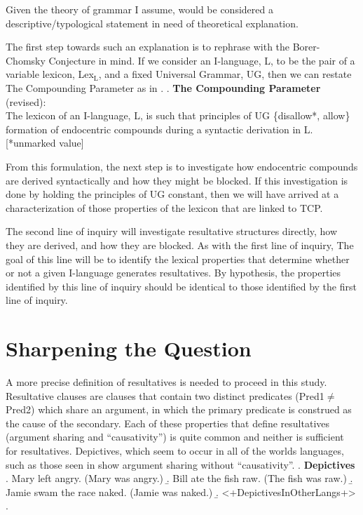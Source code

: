 \documentclass[letterpaper,12pt]{article}
\newcommand{\figex}{\refstepcounter{ExNo}\theExNo\hspace{\Exlabelsep}}
\begin{document}
Given the theory of grammar I assume, \Last would be considered a descriptive/typological statement in need of theoretical explanation.

The first step towards such an explanation is to rephrase \Last with the Borer-Chomsky Conjecture in mind.
If we consider an I-language, L, to be the pair of a variable lexicon, Lex$_\text{L}$, and a fixed Universal Grammar, UG, then we can restate The Compounding Parameter as in \Next.
\ex. \textbf{The Compounding Parameter} (revised):\\
The lexicon of an I-language, L, is such that principles of UG \{disallow*, allow\} formation of endocentric compounds during a syntactic derivation in L. [*unmarked value]

From this formulation, the next step is to investigate how endocentric compounds are derived syntactically and how they might be blocked.
If this investigation is done by holding the principles of UG constant, then we will have arrived at a characterization of those properties of the lexicon that are linked to TCP.

The second line of inquiry will investigate resultative structures directly, how they are derived, and how they are blocked.
As with the first line of inquiry, The goal of this line will be to identify the lexical properties that determine whether or not a given I-language generates resultatives.
By hypothesis, the properties identified by this line of inquiry should be identical to those identified by the first line of inquiry.


\begin{figure}[h]
  \figex
  \label{fig:ParameterModel}
\end{figure}

\section{Sharpening the Question}\label{sec:result analysis}
A more precise definition of resultatives is needed to proceed in this study.
Resultative clauses are clauses that contain two distinct predicates (Pred1$\neq$Pred2) which share an argument, in which the primary predicate is construed as the cause of the secondary.
Each of these properties that define resultatives (argument sharing and ``causativity'') is quite common and neither is sufficient for resultatives.
Depictives, which seem to occur in all of the worlds languages, such as those seen in \Next show argument sharing without ``causativity''.
\ex. \textbf{Depictives}
\a. Mary left angry. (Mary was angry.)
\b. Bill ate the fish raw. (The fish was raw.)
\b. Jamie swam the race naked. (Jamie was naked.)
\b. <+DepictivesInOtherLangs+>
\z.
\end{document}
